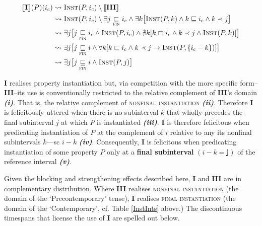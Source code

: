 \documentclass[11pt,dvipsnames]{report}
\providecommand{\denote}[2][]{\ensuremath{\llbracket{#2}\rrbracket^{#1}}}
\begin{document}
\begin{align}
\denote{\textbf{I}}(P)(i_c)&\rightsquigarrow \textsc{Inst}(P,i_c)\setminus\denote{\textbf{III}} \\
&\rightsquigarrow \textsc{Inst}(P,i_c)\setminus \exists j\underset{\textsc{fin}}{\sqsubset}i_c\wedge\exists k\big[\textsc{Inst}(P,k)\wedge k\sqsubseteq i_c\wedge k\prec j\big]\\
&\rightsquigarrow  \exists j\big[j\underset{\textsc{fin}}{\sqsubseteq}i_c\wedge\textsc{Inst}(P,i_c)\wedge\nexists k[k\sqsubset i_c\wedge k\prec j\wedge\textsc{Inst}(P,k)]\big]\\
&\rightsquigarrow\exists j\big[j\underset{\textsc{fin}}{\sqsubseteq} i\wedge\forall k[k\sqsubset i_c\wedge k\prec j\to\textsc{Inst}(P,\{i_c-k\})]\big] \\
&\rightsquigarrow \exists j\big[j\underset{\textsc{fin}}{\sqsubseteq}i\wedge\textsc{Inst}(P,j)\big]
\end{align}

\small\textbf{I} realises property instantiation but, via competition with the more specific form--\textbf{III}--its use is conventionally restricted to the relative complement of \textbf{III}'s domain \textbf{\textit{(i)}}. That is, the relative complement of \textsc{nonfinal instantiation} \textbf{\textit{(ii)}}. Therefore \textbf{I} is felicitously uttered when there is no subinterval $ k $ that wholly precedes the final subinterval $ j $ at which $ P $ is instantiated \textbf{\textit{(iii)}}. \textbf{I} is therefore felicitous when predicating instantiation of $ P $ at the complement of $ i $ relative to any its nonfinal subintervals $ k $---sc $ i-k $ \textbf{\textit{(iv)}}. Consequently, \textbf{I} is felicitous when predicating instantiation of some property $ P $ only at a \textbf{final subinterval} $( i-k=\boldsymbol j )$ of the reference interval \textbf{\textit{(v)}}.
\xe

Given the blocking and strengthening effects described here, \textbf{I} and \textbf{III} are in complementary distribution. Where \textbf{III} realises \textsc{nonfinal instantiation} (the domain of the `Precontemporary' tense), \textbf{I} realises \textsc{final instantiation} (the domain of the `Contemporary', cf. Table \ref{InstInts} above.) The discontinuous timespans that license the use of \textbf{I} are spelled out below.
\end{document}
